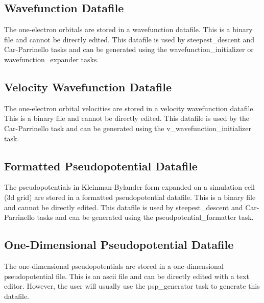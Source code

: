 \subsection{Wavefunction Datafile}
The one-electron orbitals are stored in a wavefunction datafile.  This
is a binary file and cannot be directly edited.  This datafile is used
by steepest\_descent and Car-Parrinello tasks and can be generated
using the wavefunction\_initializer or wavefunction\_expander tasks.

\subsection{Velocity Wavefunction Datafile}
The one-electron orbital velocities are stored in a velocity wavefunction 
datafile.  This is a binary file and cannot be directly edited.  This datafile 
is used by the Car-Parrinello task and can be generated
using the v\_wavefunction\_initializer task.

\subsection{Formatted Pseudopotential Datafile}
The pseudopotentials in Kleinman-Bylander form expanded on a simulation
cell (3d grid) are stored in a formatted pseudopotential datafile.
This is a binary file and cannot be directly edited.
This datafile 
is used by steepest\_descent and Car-Parrinello tasks and can be generated
using the pseudpotential\_formatter task.

\subsection{One-Dimensional Pseudopotential Datafile}
The one-dimensional pseudopotentials are stored in a one-dimensional 
pseudopotential file.  This is an ascii file and can be directly edited with
a text editor.  However, the user will usually use the psp\_generator
task to generate this datafile.

